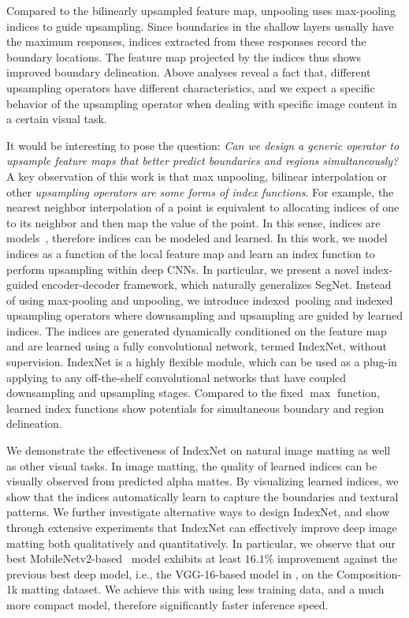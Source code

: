 \documentclass[10pt,twocolumn,letterpaper]{article}
\begin{document}
Compared to the bilinearly upsampled feature map, unpooling uses max-pooling indices to guide upsampling. Since boundaries in the shallow layers usually have the maximum responses, indices extracted from these responses record the boundary locations. The feature map projected by the indices thus shows improved boundary delineation. Above analyses reveal a fact that, different upsampling operators have different characteristics, and we expect a specific behavior of the upsampling operator when dealing with specific image content in a certain visual task.





It would be interesting to pose the question: \textit{Can we design a generic operator to upsample feature maps that better predict boundaries and regions simultaneously?} A key observation of this work is that max unpooling, bilinear interpolation or other \textit{upsampling operators are some forms of index functions}. For example, the nearest neighbor interpolation of a point is equivalent to allocating indices of one to its neighbor and then map the value of the point. In this sense, indices are models~\cite{kraska2018case}, therefore indices can be modeled and learned. In this work, we model indices as a function of the local feature map and learn an index function to perform upsampling within deep CNNs. In particular, we present a novel index-guided encoder-decoder framework, which naturally generalizes SegNet. Instead of using  max-pooling and unpooling, we introduce \mbox{indexed pooling} and indexed upsampling operators where downsampling and upsampling are guided by learned indices. The indices are generated dynamically conditioned on the feature map and are learned using a fully convolutional network, termed IndexNet, without supervision. IndexNet is a highly flexible module, which can be used as a plug-in applying to any off-the-shelf convolutional networks that have coupled downsampling and upsampling stages. Compared to the fixed $\max$ function, learned index functions show potentials for simultaneous boundary and region delineation.

We demonstrate the effectiveness of IndexNet on natural image matting as well as other visual tasks. In image matting, the quality of learned indices can be visually observed from predicted alpha mattes. By visualizing learned indices, we show that the indices automatically learn to capture the boundaries and textural patterns.
We further investigate alternative ways to design IndexNet, and show through extensive experiments that IndexNet can effectively improve deep image matting  both qualitatively and quantitatively. In particular, we observe that our best MobileNetv2-based~\cite{sandler2018mobilenetv2} model exhibits at least $16.1\%$ improvement against the previous best deep model, i.e., the VGG-16-based model in \cite{xu2017deep}, on the Composition-1k matting dataset.  We achieve this with using less training data, and a much more compact model, therefore significantly faster inference speed.
\end{document}
